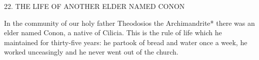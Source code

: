 22. THE LIFE OF ANOTHER ELDER
NAMED CONON

In the community of our holy father Theodosios the Archimandrite*
there was an elder named Conon, a native of Cilicia. This is the rule
of life which he maintained for thirty-five years: he partook of bread
and water once a week, he worked unceasingly and he never went
out of the church.
